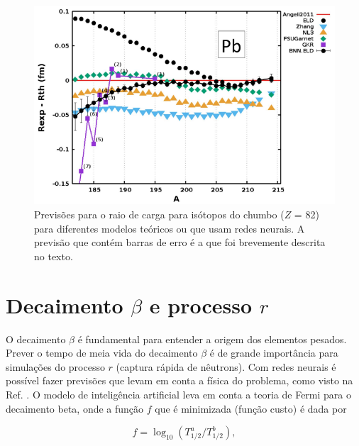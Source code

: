 \documentclass[a4paper,12pt,oneside]{book}
\begin{document}
\begin{appendices}
\begin{figure}[H]
    \centering
    \includegraphics[scale = 0.60]{figs/radii.png}
    \caption{Previsões para o raio de carga para isótopos do chumbo ($Z$ = 82) para diferentes modelos teóricos ou que usam redes neurais. A previsão que contém barras de erro é a que foi brevemente descrita no texto.}
    \label{fig:radii}
\end{figure}


\section{Decaimento $\beta$ e processo $r$}

\par O decaimento $\beta$ é fundamental para entender a origem dos elementos pesados. Prever o tempo de meia vida do decaimento $\beta$ é de grande importância para simulações do processo $r$ (captura rápida de nêutrons). Com redes neurais é possível fazer previsões que levam em conta a física do problema, como visto na Ref. \cite{mlbetadecay}. O modelo de inteligência artificial leva em conta a teoria de Fermi para o decaimento beta, onde a função $f$ que é minimizada (função custo) é dada por

\begin{equation}\label{eq:half_life}
    f = \log_{10}(T^{a}_{1/2}/T^{b}_{1/2}),
\end{equation}


\end{appendices}
\end{document}
